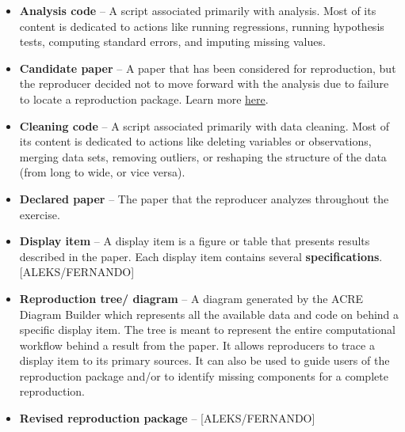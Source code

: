 \documentclass[]{book}
\providecommand{\tightlist}{%
  \setlength{\itemsep}{0pt}\setlength{\parskip}{0pt}}
\begin{document}
\begin{itemize}
\tightlist
\item
  \textbf{Analysis code} -- A script associated primarily with analysis. Most of its content is dedicated to actions like running regressions, running hypothesis tests, computing standard errors, and imputing missing values.\\
\item
  \textbf{Candidate paper} -- A paper that has been considered for reproduction, but the reproducer decided not to move forward with the analysis due to failure to locate a reproduction package. Learn more \href{https://bitss.github.io/ACRE/scoping.html\#from-candidate-to-declared-paper}{here}.
\item
  \textbf{Cleaning code} -- A script associated primarily with data cleaning. Most of its content is dedicated to actions like deleting variables or observations, merging data sets, removing outliers, or reshaping the structure of the data (from long to wide, or vice versa).\\
\item
  \textbf{Declared paper} -- The paper that the reproducer analyzes throughout the exercise.
\item
  \textbf{Display item} -- A display item is a figure or table that presents results described in the paper. Each display item contains several \textbf{specifications}. {[}ALEKS/FERNANDO{]}\\
\item
  \textbf{Reproduction tree/ diagram} -- A diagram generated by the ACRE Diagram Builder which represents all the available data and code on behind a specific display item. The tree is meant to represent the entire computational workflow behind a result from the paper. It allows reproducers to trace a display item to its primary sources. It can also be used to guide users of the reproduction package and/or to identify missing components for a complete reproduction.
\item
  \textbf{Revised reproduction package} -- {[}ALEKS/FERNANDO{]}
\end{itemize}


\end{document}
